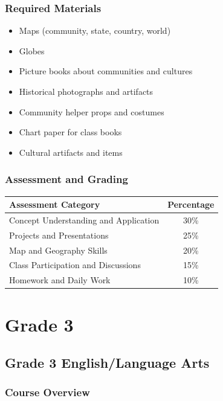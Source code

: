 \documentclass[11pt,letterpaper]{report}
\begin{document}
\section{Required Materials}

\begin{itemize}
    \item Maps (community, state, country, world)
    \item Globes
    \item Picture books about communities and cultures
    \item Historical photographs and artifacts
    \item Community helper props and costumes
    \item Chart paper for class books
    \item Cultural artifacts and items
\end{itemize}

\section{Assessment and Grading}

\begin{center}
\begin{tabular}{|l|c|}
\hline
\textbf{Assessment Category} & \textbf{Percentage} \\
\hline
Concept Understanding and Application & 30\% \\
\hline
Projects and Presentations & 25\% \\
\hline
Map and Geography Skills & 20\% \\
\hline
Class Participation and Discussions & 15\% \\
\hline
Homework and Daily Work & 10\% \\
\hline
\end{tabular}
\end{center}

\clearpage

\part{Grade 3}

\chapter{Grade 3 English/Language Arts}

\section{Course Overview}
\end{document}
